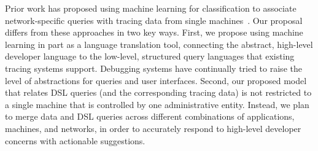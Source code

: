 
Prior work has proposed using machine learning for classification to associate
network-specific queries with tracing data from single
machines~\cite{netpoirot}. Our proposal differs from these approaches in two
key ways. First, we propose using machine learning in part as a language
translation tool, connecting the abstract, high-level developer language to the
low-level, structured query languages that existing tracing systems support.
Debugging systems have continually tried to raise the level of abstractions for
queries and user interfaces. 
Second, our proposed model that relates DSL
queries (and the corresponding tracing data) is not restricted to a single
machine that is controlled by one administrative entity. Instead, we plan to
merge data and DSL queries across different combinations of applications,
machines, and networks, in order to accurately respond to high-level developer
concerns with actionable suggestions.


